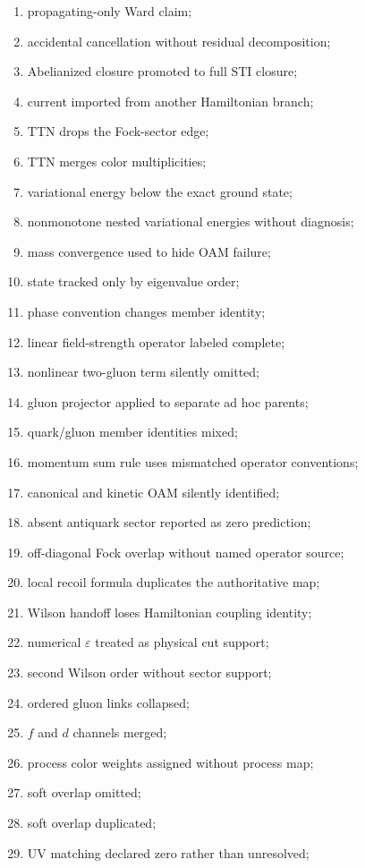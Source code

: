 \documentclass[11pt]{article}
\newcommand{\eps}{\varepsilon}
\begin{document}
\begin{enumerate}
 \item propagating-only Ward claim;
 \item accidental cancellation without residual decomposition;
 \item Abelianized closure promoted to full STI closure;
 \item current imported from another Hamiltonian branch;
 \item TTN drops the Fock-sector edge;
 \item TTN merges color multiplicities;
 \item variational energy below the exact ground state;
 \item nonmonotone nested variational energies without diagnosis;
 \item mass convergence used to hide OAM failure;
 \item state tracked only by eigenvalue order;
 \item phase convention changes member identity;
 \item linear field-strength operator labeled complete;
 \item nonlinear two-gluon term silently omitted;
 \item gluon projector applied to separate ad hoc parents;
 \item quark/gluon member identities mixed;
 \item momentum sum rule uses mismatched operator conventions;
 \item canonical and kinetic OAM silently identified;
 \item absent antiquark sector reported as zero prediction;
 \item off-diagonal Fock overlap without named operator source;
 \item local recoil formula duplicates the authoritative map;
 \item Wilson handoff loses Hamiltonian coupling identity;
 \item numerical \(\eps\) treated as physical cut support;
 \item second Wilson order without sector support;
 \item ordered gluon links collapsed;
 \item \(f\) and \(d\) channels merged;
 \item process color weights assigned without process map;
 \item soft overlap omitted;
 \item soft overlap duplicated;
 \item UV matching declared zero rather than unresolved;

\end{enumerate}
\end{document}
